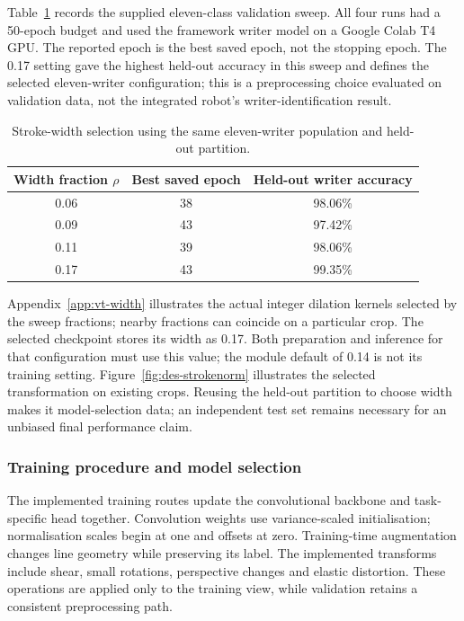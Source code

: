 Table~\ref{tab:des-widthselection} records the supplied eleven-class validation sweep. All four runs had a 50-epoch budget and used the framework writer model on a Google Colab T4 GPU. The reported epoch is the best saved epoch, not the stopping epoch. The 0.17 setting gave the highest held-out accuracy in this sweep and defines the selected eleven-writer configuration; this is a preprocessing choice evaluated on validation data, not the integrated robot's writer-identification result.

\begin{table}[!htbp]\centering\small
\begin{tabular}{|c|c|c|}
\hline\textbf{Width fraction $\rho$}&\textbf{Best saved epoch}&\textbf{Held-out writer accuracy}\\\hline
0.06&38&98.06\%\\\hline
0.09&43&97.42\%\\\hline
0.11&39&98.06\%\\\hline
0.17&43&99.35\%\\\hline
\end{tabular}
\caption{Stroke-width selection using the same eleven-writer population and held-out partition.}
\label{tab:des-widthselection}
\end{table}

Appendix~\ref{app:vt-width} illustrates the actual integer dilation kernels selected by the sweep fractions; nearby fractions can coincide on a particular crop. The selected checkpoint stores its width as 0.17. Both preparation and inference for that configuration must use this value; the module default of 0.14 is not its training setting. Figure~\ref{fig:des-strokenorm} illustrates the selected transformation on existing crops. Reusing the held-out partition to choose width makes it model-selection data; an independent test set remains necessary for an unbiased final performance claim.

\subsubsection{Training procedure and model selection}
\label{sec:des-training}
The implemented training routes update the convolutional backbone and task-specific head together. Convolution weights use variance-scaled initialisation; normalisation scales begin at one and offsets at zero. Training-time augmentation changes line geometry while preserving its label. The implemented transforms include shear, small rotations, perspective changes and elastic distortion. These operations are applied only to the training view, while validation retains a consistent preprocessing path.


